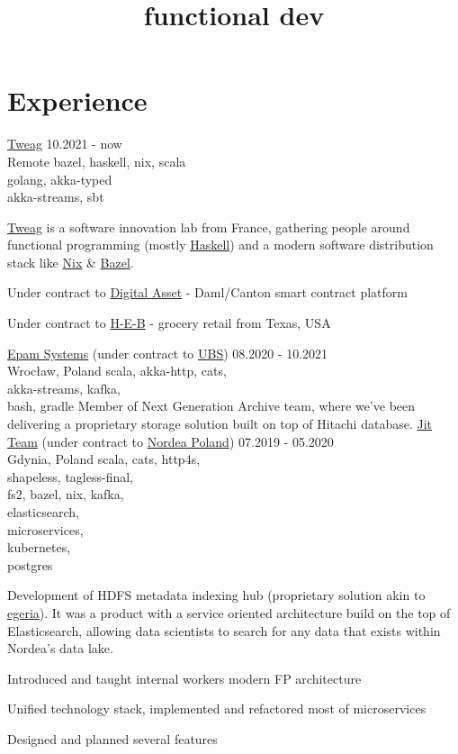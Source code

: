\documentclass[a4paper,11pt]{cv4tw}%
\title{functional dev}
\begin{document}
\section{Experience}
      {\href{https://www.tweag.io}{Tweag}}
      {10.2021 - now\\Remote}
      {bazel, haskell, nix, scala\\golang, akka-typed\\akka-streams, sbt}
      { \href{tweag.io}{Tweag} is a software innovation lab from France, gathering people around
        functional programming (mostly \href{https://www.haskell.org}{Haskell}) and a modern
        software distribution stack like \href{https://nixos.org}{Nix} \& \href{https://bazel.build}{Bazel}.
        \begin{missions}
        \item Under contract to \href{https://www.digitalasset.com}{Digital Asset} -
          Daml/Canton smart contract platform
        \item Under contract to \href{https://www.heb.com}{H-E-B} -
          grocery retail from Texas, USA
        \end{missions}
      }
      {\href{https://www.epam.com}{Epam Systems} (under contract to \href{https://www.ubs.com}{UBS})}
      {08.2020 - 10.2021\\Wrocław, Poland}
      {scala, akka-http, cats,\\akka-streams, kafka,\\bash, gradle}
      {Member of Next Generation Archive team, where we've been delivering a proprietary storage solution built on
        top of Hitachi database.
      }
      {\href{https://www.jit.team}{Jit Team} (under contract to \href{https://www.nordea.com}{Nordea Poland})}
      {07.2019 - 05.2020\\Gdynia, Poland}
      {scala, cats, http4s,\\shapeless, tagless-final,\\fs2, bazel, nix, kafka,\\elasticsearch,\\microservices,\\kubernetes,\\postgres
      }
      {Development of HDFS metadata indexing hub (proprietary solution akin to \href{https://egeria.odpi.org}{egeria}).
        It was a product with a service oriented architecture build on the top of
        Elasticsearch, allowing data scientists to search for any data that exists
        within Nordea's data lake.
        \begin{missions}
        \item Introduced and taught internal workers modern FP architecture
        \item Unified technology stack, implemented and refactored most of microservices
        \item Designed and planned several features
        \end{missions}
      }
\end{document}
